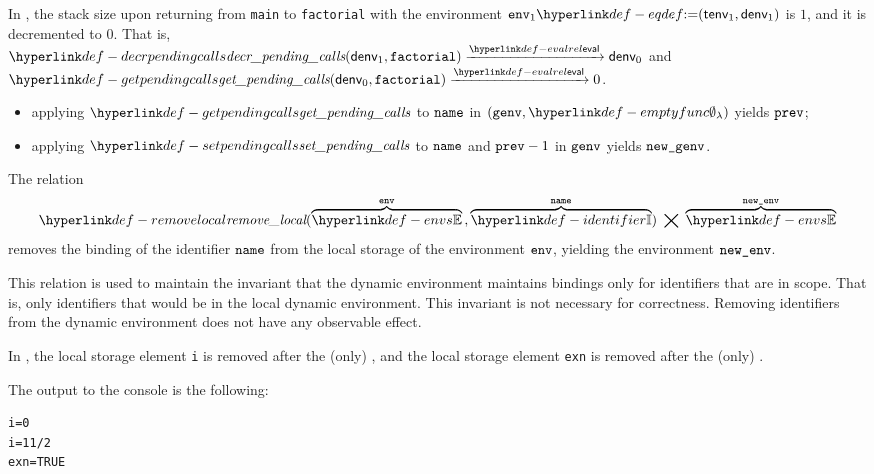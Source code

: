 In , the stack size upon returning from \verb|main| to \verb|factorial|
with the environment $\env_1 \eqdef (\tenv_1, \denv_1)$ is $1$, and it is decremented to $0$.
That is, \\
$\decrpendingcalls(\denv_1, \factorial) \evalarrow \denv_0$
and\\
$\getpendingcalls(\denv_0, \factorial) \evalarrow 0$.

\ProseParagraph
\AllApply
\begin{itemize}
  \item applying $\getpendingcalls$ to $\name$ in $(\genv, \emptyfunc)$ yields $\vprev$;
  \item applying $\setpendingcalls$ to $\name$ and $\vprev - 1$ in $\genv$ yields $\newgenv$.
\end{itemize}

\FormallyParagraph
\begin{mathpar}
\end{mathpar}

\ProseParagraph
The relation
\hypertarget{def-removelocal}{}
\[
  \removelocal(\overname{\envs}{\env} \aslsep \overname{\Identifiers}{\name}) \;\aslrel\; \overname{\envs}{\newenv}
\]
removes the binding of the identifier $\name$ from the local storage of the environment $\env$,
yielding the environment $\newenv$.

This relation is used to maintain the invariant that the dynamic environment
maintains bindings only for identifiers that are in scope. That is, only identifiers
that would be in the local dynamic environment.
%
This invariant is not necessary for correctness.
Removing identifiers from the dynamic environment does not have any
observable effect.

In , the local storage element \verb|i| is removed after the (only) \forstatementterm,
and the local storage element \verb|exn| is removed after the (only) \trystatementterm.

The output to the console is the following:
\begin{Verbatim}[fontsize=\footnotesize, frame=single]
i=0
i=11/2
exn=TRUE
\end{Verbatim}

